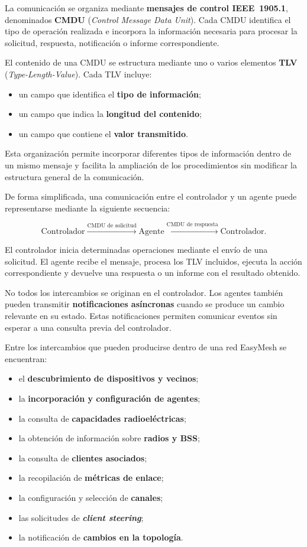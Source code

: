 La comunicación se organiza mediante
\textbf{mensajes de control IEEE~1905.1}, denominados
\textbf{CMDU} (\textit{Control Message Data Unit}). Cada CMDU identifica
el tipo de operación realizada e incorpora la información necesaria para
procesar la solicitud, respuesta, notificación o informe correspondiente.

El contenido de una CMDU se estructura mediante uno o varios elementos
\textbf{TLV} (\textit{Type-Length-Value}). Cada TLV incluye:

\begin{itemize}
    \item un campo que identifica el \textbf{tipo de información};
    \item un campo que indica la \textbf{longitud del contenido};
    \item un campo que contiene el \textbf{valor transmitido}.
\end{itemize}

Esta organización permite incorporar diferentes tipos de información
dentro de un mismo mensaje y facilita la ampliación de los procedimientos
sin modificar la estructura general de la comunicación.

De forma simplificada, una comunicación entre el controlador y un agente
puede representarse mediante la siguiente secuencia:

\[
    \text{Controlador}
    \xrightarrow{\text{CMDU de solicitud}}
    \text{Agente}
    \xrightarrow{\text{CMDU de respuesta}}
    \text{Controlador}.
\]

El controlador inicia determinadas operaciones mediante el envío de una
solicitud. El agente recibe el mensaje, procesa los TLV incluidos, ejecuta
la acción correspondiente y devuelve una respuesta o un informe con el
resultado obtenido.

No todos los intercambios se originan en el controlador. Los agentes
también pueden transmitir \textbf{notificaciones asíncronas} cuando se
produce un cambio relevante en su estado. Estas notificaciones permiten
comunicar eventos sin esperar a una consulta previa del controlador.

Entre los intercambios que pueden producirse dentro de una red EasyMesh
se encuentran:

\begin{itemize}
    \item el \textbf{descubrimiento de dispositivos y vecinos};
    \item la \textbf{incorporación y configuración de agentes};
    \item la consulta de \textbf{capacidades radioeléctricas};
    \item la obtención de información sobre \textbf{radios y BSS};
    \item la consulta de \textbf{clientes asociados};
    \item la recopilación de \textbf{métricas de enlace};
    \item la configuración y selección de \textbf{canales};
    \item las solicitudes de \textbf{\textit{client steering}};
    \item la notificación de \textbf{cambios en la topología}.
\end{itemize}

